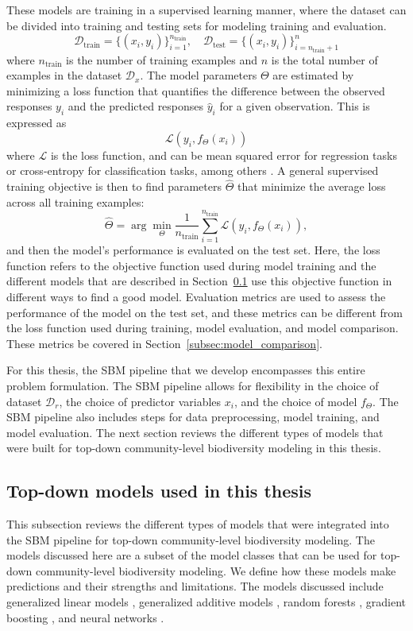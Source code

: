 These models are training in a supervised learning manner, where the dataset can be divided into training and testing sets for modeling training and evaluation. 
\[\mathcal{D}_{\text{train}} = \{(x_i,y_i)\}_{i=1}^{n_{\text{train}}}, 
\quad 
\mathcal{D}_{\text{test}} = \{(x_i,y_i)\}_{i=n_{\text{train}}+1}^{n}\]
where \(n_{\text{train}}\) is the number of training examples and \(n\) is the total number of examples in the dataset \(\mathcal{D}_x\). The model parameters \(\Theta\) are estimated by minimizing a loss function that quantifies the difference between the observed responses \(y_i\) and the predicted responses \(\hat{y}_i\) for a given observation. This is expressed as 
\[\mathcal{L}(y_i, f_\Theta(x_i)) \]
where \(\mathcal{L}\) is the loss function, and can be mean squared error for regression tasks or cross-entropy for classification tasks, among others \parencite{friedman2001}. A general supervised training objective is then to find parameters \(\hat{\Theta}\) that minimize the average loss across all training examples:
\[\hat{\Theta} = \arg\min_{\Theta} \frac{1}{n_{\text{train}}} \sum_{i=1}^{n_{\text{train}}} \mathcal{L}(y_i, f_\Theta(x_i)),\]
and then the model's performance is evaluated on the test set. Here, the loss function refers to the objective function used during model training and the different models that are described in Section~\ref{subsec:Models-in-this-thesis} use this objective function in different ways to find a good model. Evaluation metrics are used to assess the performance of the model on the test set, and these metrics can be different from the loss function used during training, model evaluation, and model comparison. These metrics be covered in Section~\ref{subsec:model_comparison}.

For this thesis, the SBM pipeline that we develop encompasses this entire problem formulation. The SBM pipeline allows for flexibility in the choice of dataset \(\mathcal{D}_r\), the choice of predictor variables \(x_i\), and the choice of model \(f_\Theta\). The SBM pipeline also includes steps for data preprocessing, model training, and model evaluation. The next section reviews the different types of models that were built for top-down community-level biodiversity modeling in this thesis.

\subsection{Top-down models used in this thesis}\label{subsec:Models-in-this-thesis}
This subsection reviews the different types of models that were integrated into the SBM pipeline for top-down community-level biodiversity modeling. The models discussed here are a subset of the model classes that can be used for top-down community-level biodiversity modeling. We define how these models make predictions and their strengths and limitations. The models discussed include generalized linear models \parencite{nelder1972}, generalized additive models \parencite{hastie1986}, random forests \parencite{breiman2001}, gradient boosting \parencite{friedman2001}, and neural networks \parencite{bishop_pattern_2006}.

